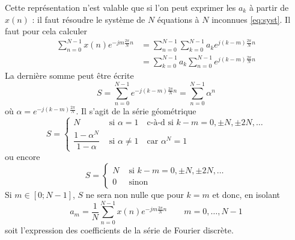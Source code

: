 \newpage
Cette représentation n'est valable que si l'on peut exprimer les $a_k$ à partir de 
$x(n)$ : il faut résoudre le système de $N$ équations à $N$ inconnues \autoref{eq:syst}. 
Il faut pour cela calculer
\begin{equation}
\begin{array}{ll}
\displaystyle\sum_{n=0}^{N-1} x(n)e^{-jm\frac{2\pi}{N}n} &= \displaystyle\sum_{n=0}^{N-1}
\sum_{k=0}^{N-1} a_k e^{j(k-m)\frac{2\pi}{N}n}\\
&=\displaystyle \sum_{k=0}^{N-1} a_k \sum_{n=0}^{N-1} e^{j(k-m)\frac{2\pi}{N}n}
\end{array}
\end{equation}
La dernière somme peut être écrite
\begin{equation}
S = \sum_{n=0}^{N-1}e^{-j(k-m)\frac{2\pi}{N}n}  = \sum_{n=0}^{N-1} \alpha^n
\end{equation}
où $\displaystyle \alpha = e^{-j(k-m)\frac{2\pi}{N}}$. Il s'agit de la série géométrique
\begin{equation}
S = \left\{\begin{array}{ll}
N & \text{ si } \alpha = 1\quad \text{c-à-d si } k-m=0,\pm N,\pm 2N,\dots\\
\dfrac{1-\alpha^N}{1-\alpha} & \text{ si } \alpha \neq 1\quad \text{car } 
\alpha^N = 1
\end{array}\right.
\end{equation}
ou encore
\begin{equation}
S=\left\{\begin{array}{ll}
N &\text{ si } k-m = 0,\pm N, \pm 2N,\dots\\
0 &\text{ sinon}
\end{array}\right.
\end{equation}
Si $m\in[0;N-1]$, $S$ ne sera non nulle que pour $k=m$ et donc, en isolant
\begin{equation}
a_m = \frac{1}{N}\sum_{n=0}^{N-1} x(n)e^{-jm\frac{2\pi}{N}n}\qquad m=0,\dots,N-1
\label{eq:nouv}
\end{equation}
soit l'expression des coefficients de la série de Fourier discrète.


	\ \\
	
